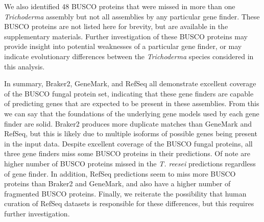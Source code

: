 
We also identified 48 BUSCO proteins that were missed in more than one \textit{Trichoderma} assembly but not all assemblies by any particular gene finder. These BUSCO proteins are not listed here for brevity, but are available in the supplementary materials. Further investigation of these BUSCO proteins may provide insight into potential weaknesses of a particular gene finder, or may indicate evolutionary differences between the \textit{Trichoderma} species considered in this analysis.


In summary, Braker2, GeneMark, and RefSeq all demonstrate excellent coverage of 
the BUSCO fungal protein set, indicating that these gene finders are
capable of predicting genes that are expected to be present in these
assemblies. From this we can say that the foundations of the
underlying gene models used by each gene finder are solid. Braker2
produces more duplicate matches than GeneMark and RefSeq, but this is
likely due to multiple isoforms of possible genes being present in the
input data. Despite excellent coverage of the BUSCO fungal proteins,
all three gene finders miss some BUSCO proteins in their
predictions. Of note are higher number of BUSCO proteins missed
in the \textit{T. reesei} predictions regardless of gene finder. In addition, RefSeq predictions seem to miss more BUSCO proteins than Braker2 and GeneMark, and also have a higher number of fragmented BUSCO proteins.
Finally, we reiterate the possibility that human curation of RefSeq datasets is responsible for these differences, but this requires further investigation.
